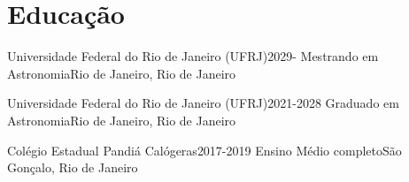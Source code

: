 \section{Educação}
    \resumeSubHeadingListStart

    \resumeSubheading
    {Universidade Federal do Rio de Janeiro (UFRJ)}{2029-}
    {Mestrando em Astronomia}{Rio de Janeiro, Rio de Janeiro}
    
    \resumeSubheading
    {Universidade Federal do Rio de Janeiro (UFRJ)}{2021-2028}
    {Graduado em Astronomia}{Rio de Janeiro, Rio de Janeiro}
    
    \resumeSubheading
    {Colégio Estadual Pandiá Calógeras}{2017-2019}
    {Ensino Médio completo}{São Gonçalo, Rio de Janeiro}

    
    \resumeSubHeadingListEnd
